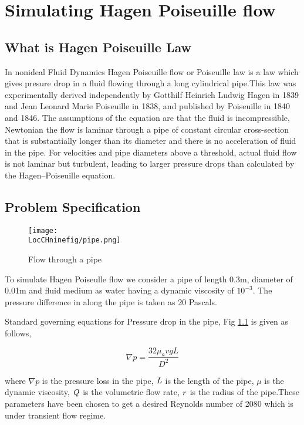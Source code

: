 \chapter{Simulating Hagen Poiseuille flow}
\thispagestyle{empty}
\label{sec:chap9}
\newcommand{\LocCHninefig}{\Origin/CHAPTERS/chap9/figures}

\section{What is Hagen Poiseuille Law}

In nonideal Fluid Dynamics Hagen Poiseuille flow or Poiseuille law is a law which gives presure drop in a fluid flowing through a long cylindrical pipe.This law was experimentally derived independently by Gotthilf Heinrich Ludwig Hagen in 1839 and Jean Leonard Marie Poiseuille in 1838, and published by Poiseuille in 1840 and 1846. The assumptions of the equation are that the fluid is incompressible, Newtonian the flow is laminar through a pipe of constant circular cross-section that is substantially longer than its diameter and there is no acceleration of fluid in the pipe. For velocities and pipe diameters above a threshold, actual fluid flow is not laminar but turbulent, leading to larger pressure drops than calculated by the Hagen–Poiseuille equation.

\section{Problem Specification}

\begin{figure}[h]  
\centering
\texttt{[image: \\LocCHninefig/pipe.png]}
\caption{Flow through a pipe}
\label{pipe}
\end{figure}

To simulate Hagen Poiseulle flow we consider a pipe of length 0.3m, diameter of 0.01m and fluid medium as water having a dynamic viscosity of $10^{-3}$. The pressure difference in along the pipe is taken as 20 Pascals.\newline

\flushleft Standard governing equations for Pressure drop in the pipe, Fig \ref{pipe} is given as follows, 

\begin{equation}
\nabla p = \frac{32 \mu_avg L }{D^2}
\end{equation}

\flushleft where $\nabla p$ is the pressure loss in the pipe, $\it{L}$ is the length of the pipe, $\mu$ is the dynamic viscosity, $\it{Q}$ is the volumetric flow rate, $\it{r}$ is the radius of the pipe.These parameters have been chosen to get a desired Reynolds number of 2080 which is under transient flow regime.\newline

